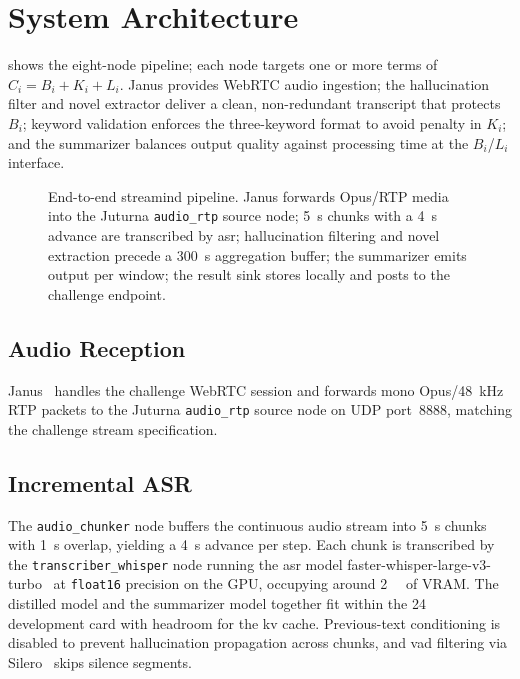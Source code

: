 \documentclass[conference,letterpaper]{IEEEtran}
\begin{document}
\section{System Architecture}
\label{sec:architecture}

 shows the eight-node pipeline; each node targets one or more terms of $C_i = B_i + K_i + L_i$.
Janus provides WebRTC audio ingestion; the hallucination filter and novel extractor deliver a clean, non-redundant transcript that protects $B_i$; keyword validation enforces the three-keyword format to avoid penalty in $K_i$; and the summarizer balances output quality against processing time at the $B_i$/$L_i$ interface.

\begin{figure}[hbt!]
    \centering
    
    \caption{End-to-end \gls{streamind} pipeline. Janus forwards Opus/RTP media into the Juturna \texttt{audio\_rtp} source node; \SI{5}{\second} chunks with a \SI{4}{\second} advance are transcribed by \gls{asr}; hallucination filtering and novel extraction precede a \SI{300}{\second} aggregation buffer; the summarizer emits output per window; the result sink stores locally and posts to the challenge endpoint.}
    \label{fig:pipeline}
    \vspace{-3mm}
\end{figure}

\subsection{Audio Reception}
\label{sec:arch:audio}

Janus~\cite{janus} handles the challenge WebRTC session and forwards mono Opus/\SI{48}{\kilo\hertz} RTP packets to the Juturna \texttt{audio\_rtp} source node on UDP port~\num{8888}, matching the challenge stream specification.

\subsection{Incremental ASR}
\label{sec:arch:asr}

The \texttt{audio\_chunker} node buffers the continuous audio stream into \SI{5}{\second} chunks with \SI{1}{\second} overlap, yielding a \SI{4}{\second} advance per step.
Each chunk is transcribed by the \texttt{transcriber\_whisper} node running the \gls{asr} model faster-whisper-large-v3-turbo~\cite{faster-whisper-large-v3-turbo-ct2} at \texttt{float16} precision on the GPU, occupying around \SI{2}{\giga\byte} of VRAM.
The distilled model and the summarizer model together fit within the \SI{24}{\giga\byte} development card with headroom for the \gls{kv} cache.
Previous-text conditioning is disabled to prevent hallucination propagation across chunks, and \gls{vad} filtering via Silero~\cite{silero-vad} skips silence segments.
\end{document}
